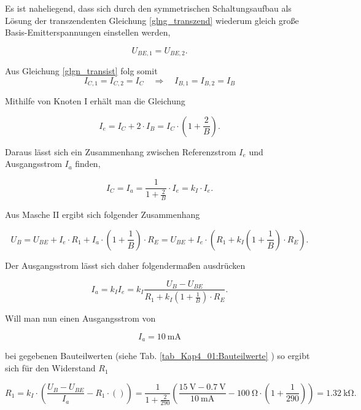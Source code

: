 Es ist naheliegend, dass sich durch den symmetrischen Schaltungsaufbau als Lösung der transzendenten Gleichung \ref{glng_transzend} wiederum gleich große Basis-Emitterspannungen einstellen werden, 

\begin{equation}
    U_{BE,1} = U_{BE,2} .
\end{equation}

Aus Gleichung \ref{glgn_transist} folg somit
\begin{equation}
    I_{C,1} = I_{C,2} = I_C \quad \Rightarrow \quad I_{B,1} = I_{B,2} = I_B
\end{equation}

Mithilfe von Knoten I erhält man die Gleichung

\begin{equation}
    I_e = I_C + 2 \cdot I_B = I_C \cdot \left( 1 + \frac{2}{B} \right) .
\end{equation}

Daraus lässt sich ein Zusammenhang zwischen Referenzstrom $I_e$ und Ausgangsstrom $I_a$ finden, 

\begin{equation}
    I_C = I_a = \frac{1}{1 + \frac{2}{B}} \cdot I_e  = k_I \cdot I_e .
\end{equation}

Aus Masche II ergibt sich folgender Zusammenhang

\begin{equation}
    U_B = U_{BE} + I_e \cdot R_1 + I_a \cdot \left(1 + \frac{1}{B} \right) \cdot R_E = U_{BE} + I_e \cdot \left( R_1 + k_I \left(1 + \frac{1}{B} \right) \cdot R_E \right) .
\end{equation}

Der Ausgangsstrom lässt sich daher folgendermaßen ausdrücken

\begin{equation}
    I_a = k_I I_e = k_I \frac{U_B - U_{BE}}{R_1 + k_I \left(1 + \frac{1}{B} \right) \cdot R_E} .
\end{equation}

Will man nun einen Ausgangsstrom von 

\begin{equation*}
    I_a = \SI{10}{\milli\ampere}
\end{equation*}

bei gegebenen Bauteilwerten (siehe Tab. \ref{tab_Kap4_01:Bauteilwerte} ) so ergibt sich für den Widerstand $R_1$

\begin{equation}
    R_1 = k_I \cdot \left(\frac{U_B - U_{BE}}{I_a} - R_1 \cdot \left( \right)\right) = \frac{1}{1+\frac{2}{290}}\left(\frac{\SI{15}{\volt} - \SI{0.7}{\volt}}{\SI{10}{\milli\ampere}} - \SI{100}{\ohm} \cdot \left( 1 + \frac{1}{290} \right)\right) = \SI{1.32}{\kilo\ohm} .
\end{equation}

